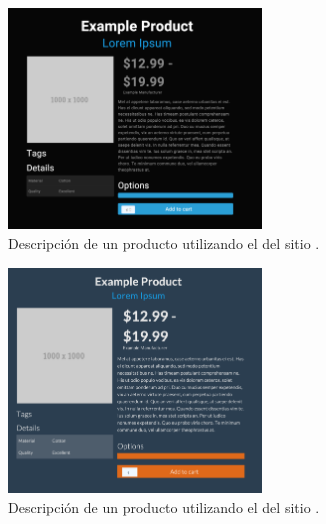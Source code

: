 \begin{figure}[H]
	\centering
	\includegraphics[width=0.6\textwidth]{figuras/bootstrap/bootstrap_theme_cyborg.png}

	\caption{Descripción de un producto utilizando el \themeCPT \textbf{\themeCyborg} del sitio \bootswatchNAME.}
	\label{figure:bootstrap:theme_cyborg}
\end{figure}


\begin{figure}[H]
	\centering
	\includegraphics[width=0.6\textwidth]{figuras/bootstrap/bootstrap_theme_superhero.png}

	\caption{Descripción de un producto utilizando el \themeCPT \textbf{\themeSuperHero} del sitio \bootswatchNAME.}
	\label{figure:bootstrap:theme_superhero}
\end{figure}

\subsubsection{\eframeworkCorePCKG}


